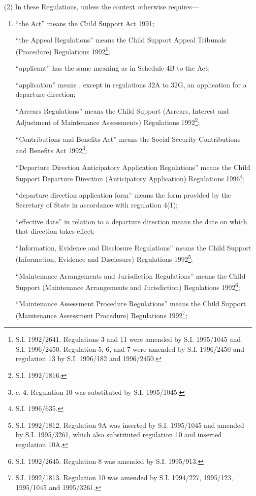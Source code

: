 \documentclass[12pt,a4paper]{article}
\begin{document}
(2) In these Regulations, unless the context otherwise requires—
\begin{enumerate}\item[]
“the Act” means the Child Support Act 1991;

“the Appeal Regulations” means the Child Support Appeal Tribunals (Procedure)
Regulations 1992\footnote{\frenchspacing S.I. 1992/2641. Regulations 3 and 11 were amended by S.I. 1995/1045 and S.I. 1996/2450. Regulation 5, 6, and 7 were amended by S.I. 1996/2450 and regulation 13 by S.I. 1996/182 and 1996/2450.};

“applicant” has the same meaning as in Schedule 4B to the Act;

“application” means%
, except in regulations 32A to 32G,  %
an application for a departure direction;

“Arrears Regulations” means the Child Support (Arrears, Interest and Adjustment
of Maintenance Assessments) Regulations 1992\footnote{\frenchspacing S.I. 1992/1816.};

“Contributions and Benefits Act” means the Social Security Contributions and
Benefits Act 1992\footnote{ c. 4. Regulation 10 was substituted by S.I. 1995/1045.};

“Departure Direction Anticipatory Application Regulations” means the Child
Support Departure Direction (Anticipatory Application) Regulations 1996\footnote{\frenchspacing S.I. 1996/635.};

“departure direction application form” means the form provided by the Secretary
of State in accordance with regulation 4(1);

“effective date” in relation to a departure direction means the date on which
that direction takes effect;

“Information, Evidence and Disclosure Regulations” means the Child Support
(Information, Evidence and Disclosure) Regulations 1992\footnote{\frenchspacing S.I. 1992/1812. Regulation 9A was inserted by S.I. 1995/1045 and amended by S.I. 1995/3261, which also substituted regulation 10 and inserted regulation 10A.};

“Maintenance Arrangements and Jurisdiction Regulations” means the Child Support
(Maintenance Arrangements and Jurisdiction) Regulations 1992\footnote{\frenchspacing S.I. 1992/2645. Regulation 8 was amended by S.I. 1995/913.};

“Maintenance Assessment Procedure Regulations” means the Child Support
(Maintenance Assessment Procedure) Regulations 1992\footnote{\frenchspacing S.I. 1992/1813. Regulation 10 was amended by S.I. 1994/227, 1995/123, 1995/1045 and 1995/3261.};


\end{enumerate}
\end{document}
